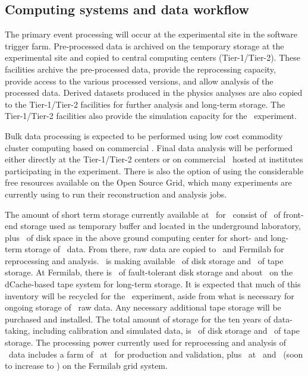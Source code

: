 \subsection{Computing systems and data workflow}
The primary event processing will occur at the experimental site in the software trigger farm. Pre-processed data is archived on the temporary storage at the experimental site and copied to central computing centers (Tier-1/Tier-2). These facilities archive the pre-processed data, provide the reprocessing capacity, provide access to the various processed versions, and allow analysis of the processed data. Derived datasets produced in the physics analyses are also copied to the Tier-1/Tier-2 facilities for further analysis and long-term storage. The Tier-1/Tier-2 facilities also provide the simulation capacity for the \DSks\ experiment. 

Bulk data processing is expected to be performed using low cost commodity cluster computing based on commercial \CPUs.  Final data analysis will be performed either directly at the Tier-1/Tier-2 centers or on commercial \CPUs\ hosted at institutes participating in the experiment.  There is also the option of using the considerable free resources available on the Open Source Grid, which many experiments are currently using to run their reconstruction and analysis jobs.

The amount of short term storage currently available at \LNGS\ for \DSfs\ consist of \DSfDataStorageLNGSShortDisk\ of front-end storage used as temporary buffer and located in the underground laboratory, plus \DSfDataStorageLNGSLongDisk\ of disk space in the above ground computing center for short- and long-term storage of \DSfs\ data.  From there, raw data are copied to \CNAF\ and Fermilab for reprocessing and analysis.  \CNAF\ is making available \DSfDataStorageCNAFDisk\ of disk storage and \DSfDataStorageCNAFTape\ of tape storage.  At Fermilab, there is \DSfDataStorageFNALDisk\ of fault-tolerant disk storage and about \DSfDataStorageFNALTape\ on the dCache-based tape system for long-term storage.  It is expected that much of this inventory will be recycled for the \DSks\ experiment, aside from what is necessary for ongoing storage of \DSfs\ raw data.  Any necessary additional tape storage will be purchased and installed. The total amount of storage for the ten years of data-taking, including calibration and simulated data, is \DSkDataStorageTotalDiskNewProposalExtended\ of disk storage and \DSkDataStorageTotalDiskNewProposalExtended\ of tape storage. The processing power currently used for reprocessing and analysis of \DSf\ data includes a farm of \DSfCPUsLNGS\ at \LNGS\ for production and validation, plus \DSfCPUsCNAF\ at \CNAF\ and \DSfCPUsFNAL\ (soon to increase to \DSfCPUsFNALUpgrade) on the Fermilab grid system.  

